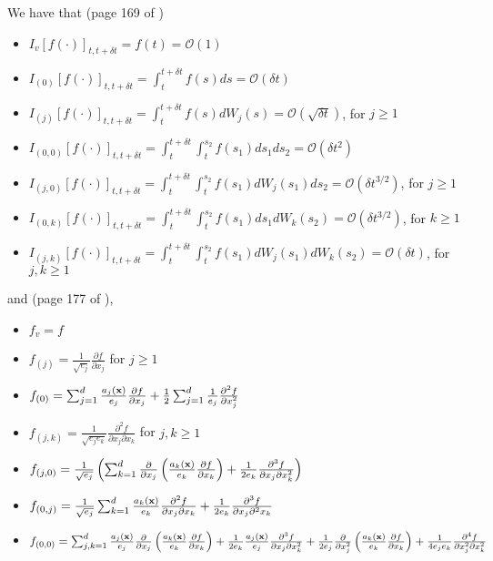 We have that (page 169 of \cite{kloeden1992numerical})
\begin{itemize}
\item $I_v [f(\cdot)]_{t, t + \delta t} = f(t) = \mathcal{O}(1)$
\item $I_{(0)} [f(\cdot)]_{t, t + \delta t} = \int_{t}^{t + \delta t} f(s) ds = \mathcal{O}(\delta t)$
\item $I_{(j)} [f(\cdot)]_{t, t + \delta t} = \int_{t}^{t + \delta t} f(s) dW_j(s) = \mathcal{O}(\sqrt{\delta t})$, for $j \ge 1$
\item $I_{(0,0)} [f(\cdot)]_{t, t + \delta t} = \int_{t}^{t + \delta t} \int_{t}^{s_2} f(s_1) ds_1 ds_2 = \mathcal{O}(\delta t^2)$
\item $I_{(j,0)} [f(\cdot)]_{t, t + \delta t} = \int_{t}^{t + \delta t} \int_{t}^{s_2} f(s_1) dW_j(s_1) ds_2 = \mathcal{O}(\delta t^{3/2})$, for $j \ge 1$
\item $I_{(0,k)} [f(\cdot)]_{t, t + \delta t} = \int_{t}^{t + \delta t} \int_{t}^{s_2} f(s_1) ds_1 dW_k(s_2) = \mathcal{O}(\delta t^{3/2})$, for $k \ge 1$
\item $I_{(j,k)} [f(\cdot)]_{t, t + \delta t} = \int_{t}^{t + \delta t} \int_{t}^{s_2} f(s_1) dW_j(s_1) dW_k(s_2) = \mathcal{O}(\delta t)$, for $j, k \ge 1$
\end{itemize}
%
and (page 177 of \cite{kloeden1992numerical}),
%
\begin{itemize}
\item $f_v = f$
\item $f_{(j)} = \frac{1}{\sqrt{e_j}} \frac{\partial f}{\partial x_j}$ for $j \ge 1$
\item $f_{(0)} = \sum_{j=1}^d \frac{a_j(\mathbf{x})}{e_j} \frac{\partial f}{\partial x_j} + \frac{1}{2}\sum_{j=1}^d \frac{1}{e_j} \frac{\partial^2 f}{\partial x_j^2}$
\item $f_{(j, k)} = \frac{1}{\sqrt{e_j e_k}} \frac{\partial^2 f}{\partial x_j \partial x_k}$ for $j,k \ge 1$
\item $f_{(j,0)} = \frac{1}{\sqrt{e_j}} \left( \sum_{k=1}^d \frac{\partial}{\partial x_j} \left( \frac{a_k(\mathbf{x})}{e_k} \frac{\partial f}{\partial x_k} \right) + \frac{1}{2 e_k} \frac{\partial^3 f}{\partial x_j \partial x_k^2} \right)$
\item $f_{(0, j)} = \frac{1}{\sqrt{e_j}} \sum_{k=1}^d \frac{a_k(\mathbf{x})}{e_k} \frac{\partial^2 f}{\partial x_j \partial x_k} +\frac{1}{2 e_k}  \frac{\partial^3 f}{\partial x_j \partial^2 x_k}$
\item $f_{(0,0)} = \sum_{j,k=1}^d \frac{a_j(\mathbf{x})}{e_j} \frac{\partial}{\partial x_j} \left( \frac{a_k(\mathbf{x})}{e_k} \frac{\partial f}{\partial x_k} \right) + \frac{1}{2 e_k}\frac{a_j(\mathbf{x})}{e_j} \frac{\partial^3 f}{\partial x_j \partial x_k^2} + \frac{1}{2 e_j} \frac{\partial}{\partial x_j^2} \left( \frac{a_k(\mathbf{x})}{e_k} \frac{\partial f}{\partial x_k} \right) + \frac{1}{4 e_j e_k} \frac{\partial^4 f}{\partial x_j^2 \partial x_k^2}$
\end{itemize}
